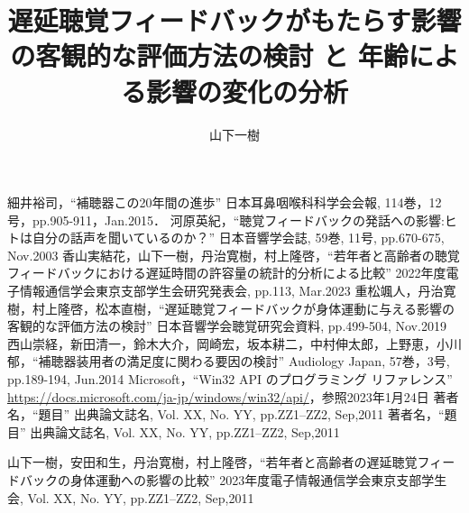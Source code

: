 \documentclass[a4paper,12pt]{jsreport}
\title{遅延聴覚フィードバックがもたらす影響の客観的な評価方法の検討
と
年齢による影響の変化の分析}
\author{山下\hspace{1zw}一樹}%
\begin{document}
\makecover%
\tableofcontents%










\begin{thebibliography}{99}
	細井裕司，``補聴器この20年間の進歩'' 日本耳鼻咽喉科科学会会報, 114巻，12号，pp.905-911，Jan.2015．
	河原英紀，``聴覚フィードバックの発話への影響:ヒトは自分の話声を聞いているのか？'' 日本音響学会誌, 59巻, 11号, pp.670-675, Nov.2003
  香山実結花，山下一樹，丹治寛樹，村上隆啓，``若年者と高齢者の聴覚フィードバックにおける遅延時間の許容量の統計的分析による比較'' 2022年度電子情報通信学会東京支部学生会研究発表会, pp.113, Mar.2023
  重松颯人，丹治寛樹，村上隆啓，松本直樹，``遅延聴覚フィードバックが身体運動に与える影響の客観的な評価方法の検討'' 日本音響学会聴覚研究会資料, pp.499-504, Nov.2019
  西山崇経，新田清一，鈴木大介，岡崎宏，坂本耕二，中村伸太郎，上野恵，小川郁，``補聴器装用者の満足度に関わる要因の検討'' Audiology Japan, 57巻，3号, pp.189-194, Jun.2014
  Microsoft，``Win32 API のプログラミング リファレンス'' \url{https://docs.microsoft.com/ja-jp/windows/win32/api/}，参照2023年1月24日
  著者名，``題目'' 出典論文誌名, Vol. XX, No. YY, pp.ZZ1--ZZ2, Sep,2011
  著者名，``題目'' 出典論文誌名, Vol. XX, No. YY, pp.ZZ1--ZZ2, Sep,2011

\end{thebibliography}
\begin{thepublished}{99}
	山下一樹，安田和生，丹治寛樹，村上隆啓，``若年者と高齢者の遅延聴覚フィードバックの身体運動への影響の比較'' 2023年度電子情報通信学会東京支部学生会, Vol. XX, No. YY, pp.ZZ1--ZZ2, Sep,2011
	
\end{thepublished}
\newpage



\appendix

\end{document}

